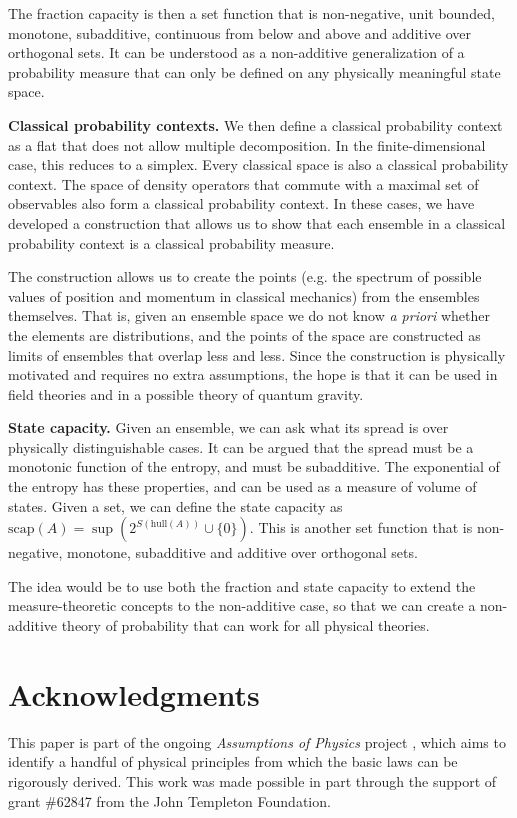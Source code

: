 \documentclass[10pt,twocolumn, nofootinbib]{revtex4-2}
\newcommand\hull{\mathrm{hull}}
\newcommand\capacity{\mathrm{scap}}
\begin{document}
The fraction capacity is then a set function that is non-negative, unit bounded, monotone, subadditive, continuous from below and above and additive over orthogonal sets. It can be understood as a non-additive generalization of a probability measure that can only be defined on any physically meaningful state space.

\textbf{Classical probability contexts.} We then define a classical probability context as a flat that does not allow multiple decomposition. In the finite-dimensional case, this reduces to a simplex. Every classical space is also a classical probability context. The space of density operators that commute with a maximal set of observables also form a classical probability context. In these cases, we have developed a construction that allows us to show that each ensemble in a classical probability context is a classical probability measure.

The construction allows us to create the points (e.g. the spectrum of possible values of position and momentum in classical mechanics) from the ensembles themselves. That is, given an ensemble space we do not know \textit{a priori} whether the elements are distributions, and the points of the space are constructed as limits of ensembles that overlap less and less. Since the construction is physically motivated and requires no extra assumptions, the hope is that it can be used in field theories and in a possible theory of quantum gravity.

\textbf{State capacity.} Given an ensemble, we can ask what its spread is over physically distinguishable cases. It can be argued that the spread must be a monotonic function of the entropy, and must be subadditive. The exponential of the entropy has these properties, and can be used as a measure of volume of states. Given a set, we can define the state capacity as $\capacity(A) = \sup(2^{S(\hull(A))}\cup\{0\})$. This is another set function that is non-negative, monotone, subadditive and additive over orthogonal sets.

The idea would be to use both the fraction and state capacity to extend the measure-theoretic concepts to the non-additive case, so that we can create a non-additive theory of probability that can work for all physical theories.

\section*{Acknowledgments}
This paper is part of the ongoing \textit{Assumptions of Physics} project \cite{aop-book}, which aims to identify a handful of physical principles from which the basic laws can be rigorously derived. This work was made possible in part through the support of grant \#62847 from the John Templeton Foundation.




\newcommand{\pj}[1] {\underbar{$#1$}}
\end{document}

